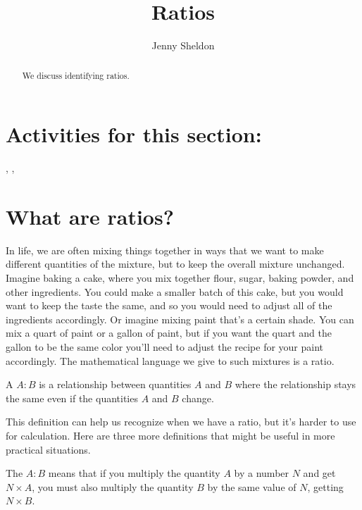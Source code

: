 \documentclass{ximera}
\title{Ratios}
\author{Jenny Sheldon}
\begin{document}
\begin{abstract}
We discuss identifying ratios.
\end{abstract}
\maketitle

\section{Activities for this section:} 
, 
, 

\section{What are ratios?}

In life, we are often mixing things together in ways that we want to make different quantities of the mixture, but to keep the overall mixture unchanged. Imagine baking a cake, where you mix together flour, sugar, baking powder, and other ingredients. You could make a smaller batch of this cake, but you would want to keep the taste the same, and so you would need to adjust all of the ingredients accordingly. Or imagine mixing paint that's a certain shade. You can mix a quart of paint or a gallon of paint, but if you want the quart and the gallon to be the same color you'll need to adjust the recipe for your paint accordingly. The mathematical language we give to such mixtures is a ratio.

\begin{definition}
A  $A:B$ is a relationship between quantities $A$ and $B$ where the relationship stays the same even if the quantities $A$ and $B$ change.
\end{definition}

This definition can help us recognize when we have a ratio, but it's harder to use for calculation. Here are three more definitions that might be useful in more practical situations. 

\begin{definition}
The  $A:B$ means that if  you multiply the quantity $A$ by a number $N$ and get $N \times A$, you must also multiply the quantity $B$ by the same value of $N$, getting $N \times B$.
\end{definition}
\end{document}
